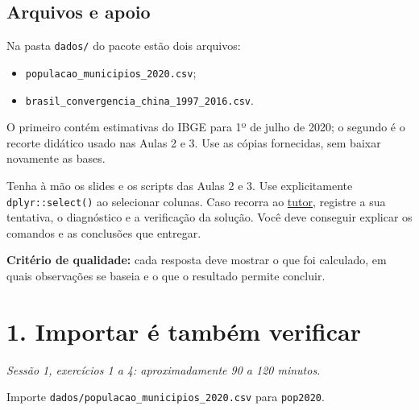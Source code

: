 \documentclass[
  brazilian,
  11pt,
  a4paper]{article}
\providecommand{\tightlist}{%
  \setlength{\itemsep}{0pt}\setlength{\parskip}{0pt}}
\begin{document}
\subsection{Arquivos e apoio}\label{arquivos-e-apoio}

Na pasta \texttt{dados/} do pacote estão dois arquivos:

\begin{itemize}
\tightlist
\item
  \texttt{populacao\_municipios\_2020.csv};
\item
  \texttt{brasil\_convergencia\_china\_1997\_2016.csv}.
\end{itemize}

O primeiro contém estimativas do IBGE para 1º de julho de 2020; o
segundo é o recorte didático usado nas Aulas 2 e 3. Use as cópias
fornecidas, sem baixar novamente as bases.

Tenha à mão os slides e os scripts das Aulas 2 e 3. Use explicitamente
\texttt{dplyr::select()} ao selecionar colunas. Caso recorra ao
\href{https://mgaldino.pythonanywhere.com/}{tutor}, registre a sua
tentativa, o diagnóstico e a verificação da solução. Você deve conseguir
explicar os comandos e as conclusões que entregar.

\textbf{Critério de qualidade:} cada resposta deve mostrar o que foi
calculado, em quais observações se baseia e o que o resultado permite
concluir.

\newpage

\section{1. Importar é também
verificar}\label{importar-uxe9-tambuxe9m-verificar}

\emph{Sessão 1, exercícios 1 a 4: aproximadamente 90 a 120 minutos.}

Importe \texttt{dados/populacao\_municipios\_2020.csv} para
\texttt{pop2020}.
\end{document}
